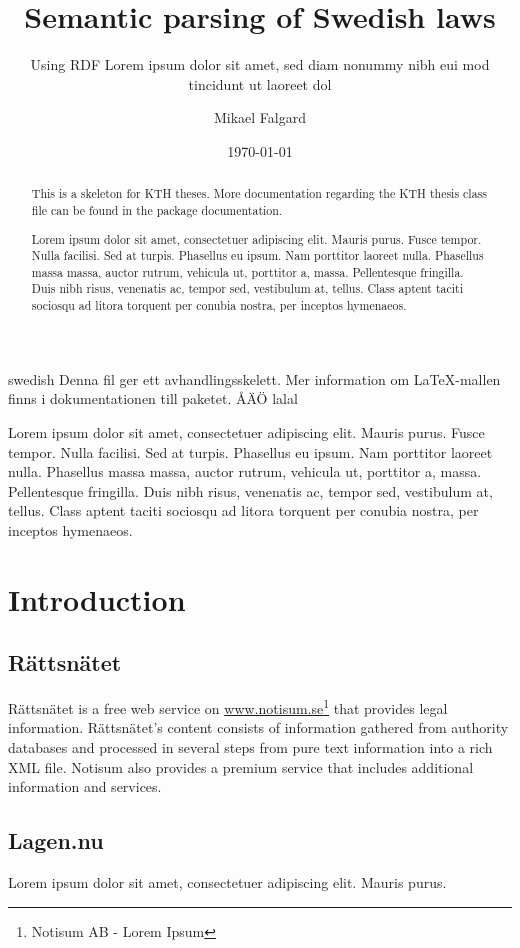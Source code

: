 \documentclass[a4paper,11pt]{kth-mag}
\title{Semantic parsing of Swedish laws}
\subtitle{Using RDF Lorem ipsum dolor sit amet, sed diam nonummy nibh eui
              mod tincidunt ut laoreet dol}
\author{Mikael Falgard}
\date{\today}
\begin{document}
\frontmatter
\pagestyle{empty}
\removepagenumbers
\maketitle
{}
\begin{abstract}
  This is a skeleton for KTH theses. More documentation
  regarding the KTH thesis class file can be found in
  the package documentation.

Lorem ipsum dolor sit amet, consectetuer adipiscing elit. Mauris
purus. Fusce tempor. Nulla facilisi. Sed at turpis. Phasellus eu
ipsum. Nam porttitor laoreet nulla. Phasellus massa massa, auctor
rutrum, vehicula ut, porttitor a, massa. Pellentesque fringilla. Duis
nibh risus, venenatis ac, tempor sed, vestibulum at, tellus. Class
aptent taciti sociosqu ad litora torquent per conubia nostra, per
inceptos hymenaeos.
\end{abstract}
\clearpage
\begin{foreignabstract}{swedish}
  Denna fil ger ett avhandlingsskelett.
  Mer information om \LaTeX-mallen finns i
  dokumentationen till paketet. ÅÄÖ lalal

Lorem ipsum dolor sit amet, consectetuer adipiscing elit. Mauris
purus. Fusce tempor. Nulla facilisi. Sed at turpis. Phasellus eu
ipsum. Nam porttitor laoreet nulla. Phasellus massa massa, auctor
rutrum, vehicula ut, porttitor a, massa. Pellentesque fringilla. Duis
nibh risus, venenatis ac, tempor sed, vestibulum at, tellus. Class
aptent taciti sociosqu ad litora torquent per conubia nostra, per
inceptos hymenaeos.
\end{foreignabstract}
\clearpage
\tableofcontents*
\mainmatter
\pagestyle{newchap}
\chapter{Introduction}

\section{Rättsnätet} Rättsnätet is a free web service on
\url{www.notisum.se}\footnote{Notisum AB - Lorem Ipsum} that provides legal
information. Rättsnätet’s content consists of information gathered from
authority databases and processed in several steps from pure text information
into a rich XML file. Notisum also provides a premium service that includes
additional information and services.


\section{Lagen.nu}
Lorem ipsum dolor sit amet, consectetuer adipiscing elit. Mauris
purus. 
\end{document}
